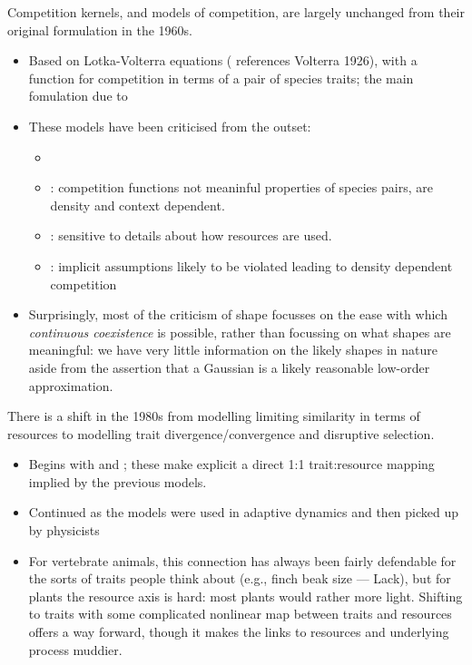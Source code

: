 \documentclass[a4paper,11pt]{article}
\begin{document}
Competition kernels, and models of competition, are largely unchanged
from their original formulation in the 1960s.
\begin{itemize}
\item Based on Lotka-Volterra equations (\citealt{MacArthur-1967}
  references Volterra 1926), with a function for competition in terms
  of a pair of species traits; the main fomulation due to
  \citet{MacArthur-1967}
\item These models have been criticised from the outset:
\begin{itemize}
\item \citet{May-1972}
\item \citet{Neill-1974}: competition functions not meaninful
  properties of species pairs, are density and context dependent.
\item \citet{Abrams-1975}: sensitive to details about how resources
  are used.
\item \citet{Abrams-1980}: implicit assumptions likely to be violated
  leading to density dependent competition
\end{itemize}
\item Surprisingly, most of the criticism of shape focusses on the
  ease with which \emph{continuous coexistence} is possible, rather
  than focussing on what shapes are meaningful: we have very little
  information on the likely shapes in nature aside from the assertion
  that a Gaussian is a likely reasonable low-order approximation.
\end{itemize}

There is a shift in the 1980s from modelling limiting similarity in
terms of resources to modelling trait divergence/convergence and
disruptive selection.
\begin{itemize}
\item Begins with \citet{Taper-1985} and \citet{Brown-1987-140}; these
  make explicit a direct 1:1 trait:resource mapping implied by the
  previous models.
\item Continued as the models were used in adaptive dynamics
  \citep[e.g.,][]{Dieckmann-1999} and then picked up by physicists
  \citep[e.g.,][]{Leimar-2013}
\item For vertebrate animals, this connection has always been fairly
  defendable for the sorts of traits people think about (e.g., finch
  beak size --- Lack), but for plants the resource axis is hard: most
  plants would rather more light.  Shifting to traits with some
  complicated nonlinear map between traits and resources offers a way
  forward, though it makes the links to resources and underlying
  process muddier.
\end{itemize}
\end{document}
